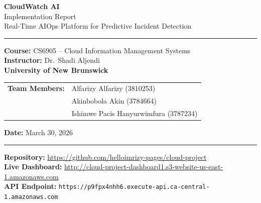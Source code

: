\documentclass[11pt,a4paper]{article}
\begin{document}
\begin{titlepage}
\begin{center}

\vspace*{1.5cm}

{\Huge\bfseries\textcolor{UNBBlue}{CloudWatch AI}}\\[0.5cm]
{\LARGE\textcolor{UNBBlue}{Implementation Report}}\\[0.3cm]
{\large Real-Time AIOps Platform for Predictive Incident Detection}

\vspace{1.5cm}

\textcolor{UNBBlue}{\rule{0.8\textwidth}{0.5pt}}

\vspace{1.5cm}

{\large
\textbf{Course:} CS6905 -- Cloud Information Management Systems\\[0.3cm]
\textbf{Instructor:} Dr.\ Shadi Aljendi\\[0.3cm]
\textbf{University of New Brunswick}
}

\vspace{1.5cm}

{\large
\begin{tabular}{ll}
\textbf{Team Members:} & Alfarizy Alfarizy (3810253) \\
                        & Akinbobola Akin (3784664) \\
                        & Ishimwe Pacis Hanyurwimfura (3787234)
\end{tabular}
}

\vspace{1.5cm}

{\large\textbf{Date:} March 30, 2026}

\vspace{1cm}

\textcolor{UNBBlue}{\rule{0.8\textwidth}{0.5pt}}

\vfill

{\small
\textbf{Repository:} \url{https://github.com/helloimrizy-pages/cloud-project}\\[0.2cm]
\textbf{Live Dashboard:} \url{http://cloud-project-dashboard1.s3-website-us-east-1.amazonaws.com}\\[0.2cm]
\textbf{API Endpoint:} \texttt{https://p9fpx4nhh6.execute-api.ca-central-1.amazonaws.com}
}

\end{center}
\end{titlepage}
\end{document}
